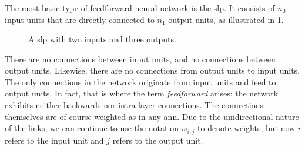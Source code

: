 \documentclass[../report.tex]{subfiles}
\begin{document}
\subsubsection{}
The most basic type of feedforward neural network is the \gls{slp}.
It consists of $n_0$ input units that are directly connected to $n_1$ output units, as illustrated in \cref{fig:slp}.
\begin{figure}
    \centering
    \caption{A \acs{slp} with two inputs and three outputs.}
    \label{fig:slp}
\end{figure}
There are no connections between input units, and no connections between output units.
Likewise, there are no connections from output units to input units. 
The only connections in the network originate from input units and feed to output units. 
In fact, that is where the term \emph{feedforward} arises: the network exhibits neither backwards nor intra-layer connections.
The connections themselves are of course weighted as in any \gls{ann}.
Due to the unidirectional nature of the links, we can continue to use the notation $w_{i,j}$ to denote weights, but now $i$ refers to the input unit and $j$ refers to the output unit.
\end{document}
